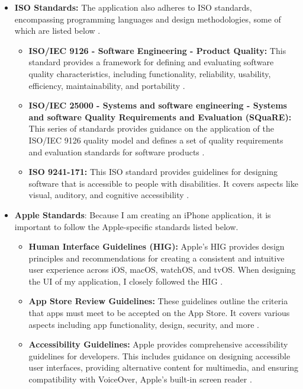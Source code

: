 \begin{itemize}
    \item \textbf{ISO Standards:} The application also adheres to ISO standards, encompassing programming languages and design methodologies, some of which are listed below \cite{ISO}.
        \begin{itemize}
        \item \textbf{ISO/IEC 9126 - Software Engineering - Product Quality:} This standard provides a framework for defining and evaluating software quality characteristics, including functionality, reliability, usability, efficiency, maintainability, and portability \cite{ISO9126}.
        \item \textbf{ISO/IEC 25000 - Systems and software engineering - Systems and software Quality Requirements and Evaluation (SQuaRE):} This series of standards provides guidance on the application of the ISO/IEC 9126 quality model and defines a set of quality requirements and evaluation standards for software products \cite{ISO25000}.
        \item \textbf{ISO 9241-171:} This ISO standard provides guidelines for designing software that is accessible to people with disabilities. It covers aspects like visual, auditory, and cognitive accessibility \cite{ISO9241-171}.
        \end{itemize}
    \item \textbf{Apple Standards}: Because I am creating an iPhone application, it is important to follow the Apple-specific standards listed below.
        \begin{itemize}
            \item \textbf{Human Interface Guidelines (HIG):} Apple's HIG provides design principles and recommendations for creating a consistent and intuitive user experience across iOS, macOS, watchOS, and tvOS. When designing the UI of my application, I closely followed the HIG \cite{HIG}.
            \item \textbf{App Store Review Guidelines:} These guidelines outline the criteria that apps must meet to be accepted on the App Store. It covers various aspects including app functionality, design, security, and more \cite{AppStore}.
            \item \textbf{Accessibility Guidelines:} Apple provides comprehensive accessibility guidelines for developers. This includes guidance on designing accessible user interfaces, providing alternative content for multimedia, and ensuring compatibility with VoiceOver, Apple's built-in screen reader \cite{AppleAccessibility}.
        \end{itemize}

\end{itemize}
